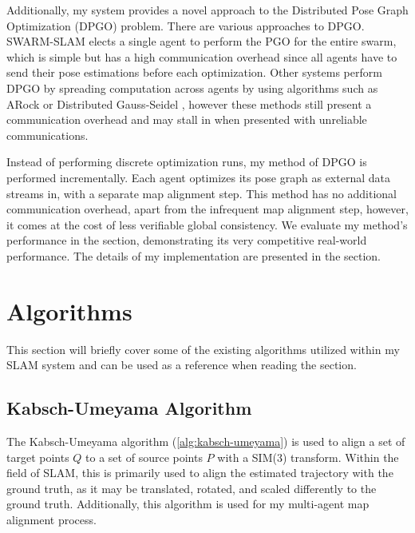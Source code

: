 Additionally, my system provides a novel approach to the Distributed Pose Graph Optimization (DPGO) problem. There are various approaches to DPGO. SWARM-SLAM \autocite{Lajoie_2024} elects a single agent to perform the PGO for the entire swarm, which is simple but has a high communication overhead since all agents have to send their pose estimations before each optimization. Other systems perform DPGO by spreading computation across agents by using algorithms such as ARock \autocite{Peng_2016} or Distributed Gauss-Seidel \autocite{DBLP:journals/corr/ChoudharyCNRCD17}, however these methods still present a communication overhead and may stall in when presented with unreliable communications.

Instead of performing discrete optimization runs, my method of DPGO is performed incrementally. Each agent optimizes its pose graph as external data streams in, with a separate map alignment step. This method has no additional communication overhead, apart from the infrequent map alignment step, however, it comes at the cost of less verifiable global consistency. We evaluate my method's performance in the  section, demonstrating its very competitive real-world performance. The details of my implementation are presented in the  section.


\section{Algorithms}
\label{sec:algorithms}
This section will briefly cover some of the existing algorithms utilized within my SLAM system and can be used as a reference when reading the  section.

\subsection{Kabsch-Umeyama Algorithm}
\label{sec:kabsch-umeyama-algorithm}
The Kabsch-Umeyama algorithm (\autoref{alg:kabsch-umeyama}) is used to align a set of target points $Q$ to a set of source points $P$ with a SIM(3) transform. Within the field of SLAM, this is primarily used to align the estimated trajectory with the ground truth, as it may be translated, rotated, and scaled differently to the ground truth. Additionally, this algorithm is used for my multi-agent map alignment process.

